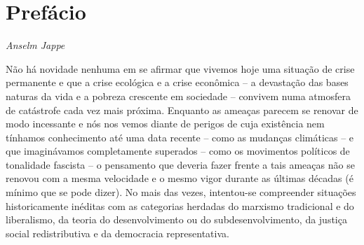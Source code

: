 

\chapter{Prefácio}


\begin{flushright}
\emph{Anselm Jappe}
\end{flushright}

Não há novidade nenhuma em se afirmar que vivemos hoje uma situação de
crise permanente e que a crise ecológica e a crise econômica -- a
devastação das bases naturas da vida e a pobreza crescente em sociedade
-- convivem numa atmosfera de catástrofe cada vez mais próxima. Enquanto
as ameaças parecem se renovar de modo incessante e nós nos vemos diante
de perigos de cuja existência nem tínhamos conhecimento até uma data
recente -- como as mudanças climáticas -- e que imaginávamos
completamente superados -- como os movimentos políticos de tonalidade
fascista -- o pensamento que deveria fazer frente a tais ameaças não se
renovou com a mesma velocidade e o mesmo vigor durante as últimas
décadas (é mínimo que se pode dizer). No mais das vezes, intentou-se
compreender situações historicamente inéditas com as categorias herdadas
do marxismo tradicional e do liberalismo, da teoria do desenvolvimento
ou do subdesenvolvimento, da justiça social redistributiva e da
democracia representativa.

